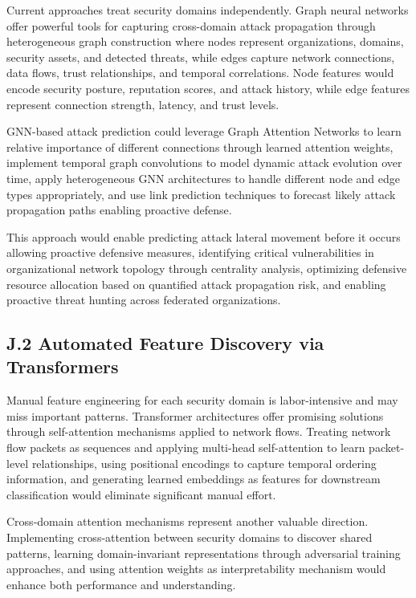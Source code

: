 \documentclass[12pt,a4paper]{article}
\theoremstyle{definition}
\begin{document}
Current approaches treat security domains independently. Graph neural networks offer powerful tools for capturing cross-domain attack propagation through heterogeneous graph construction where nodes represent organizations, domains, security assets, and detected threats, while edges capture network connections, data flows, trust relationships, and temporal correlations. Node features would encode security posture, reputation scores, and attack history, while edge features represent connection strength, latency, and trust levels.

GNN-based attack prediction could leverage Graph Attention Networks to learn relative importance of different connections through learned attention weights, implement temporal graph convolutions to model dynamic attack evolution over time, apply heterogeneous GNN architectures to handle different node and edge types appropriately, and use link prediction techniques to forecast likely attack propagation paths enabling proactive defense.

This approach would enable predicting attack lateral movement before it occurs allowing proactive defensive measures, identifying critical vulnerabilities in organizational network topology through centrality analysis, optimizing defensive resource allocation based on quantified attack propagation risk, and enabling proactive threat hunting across federated organizations.

\subsection{J.2 Automated Feature Discovery via Transformers}

Manual feature engineering for each security domain is labor-intensive and may miss important patterns. Transformer architectures offer promising solutions through self-attention mechanisms applied to network flows. Treating network flow packets as sequences and applying multi-head self-attention to learn packet-level relationships, using positional encodings to capture temporal ordering information, and generating learned embeddings as features for downstream classification would eliminate significant manual effort.

Cross-domain attention mechanisms represent another valuable direction. Implementing cross-attention between security domains to discover shared patterns, learning domain-invariant representations through adversarial training approaches, and using attention weights as interpretability mechanism would enhance both performance and understanding.
\end{document}
